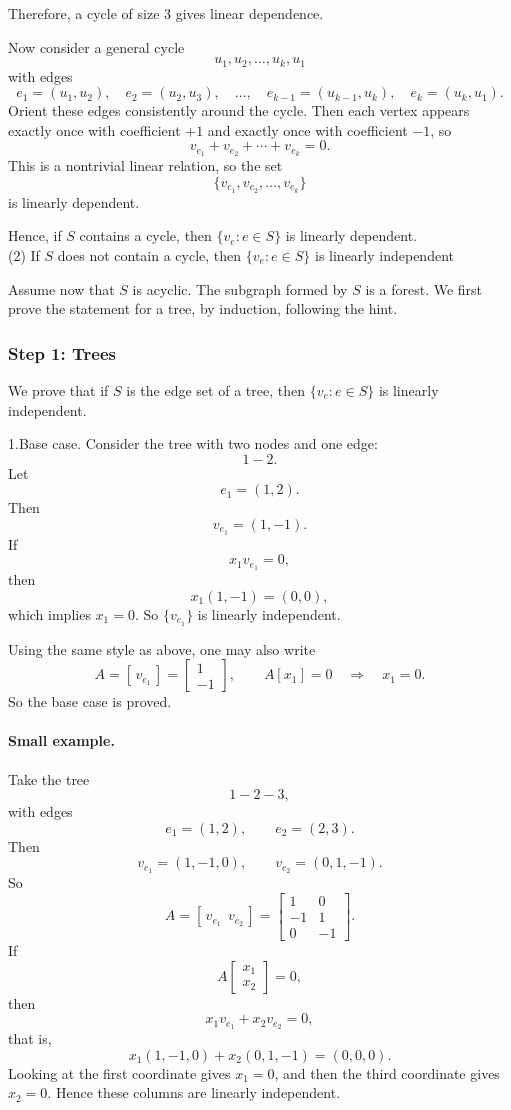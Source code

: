 \documentclass[11pt]{article}
\begin{document}
Therefore, a cycle of size $3$ gives linear dependence.

\vspace{0.5em}

Now consider a general cycle
\[
u_1,u_2,\dots,u_{k},u_1
\]
with edges
\[
e_1=(u_1,u_2),\quad
e_2=(u_2,u_3),\quad
\dots,\quad
e_{k-1}=(u_{k-1},u_k),\quad
e_k=(u_k,u_1).
\]
Orient these edges consistently around the cycle. Then each vertex appears exactly once with coefficient $+1$ and exactly once with coefficient $-1$, so
\[
v_{e_1}+v_{e_2}+\cdots+v_{e_k}=0.
\]
This is a nontrivial linear relation, so the set
\[
\{v_{e_1},v_{e_2},\dots,v_{e_k}\}
\]
is linearly dependent.

Hence, if $S$ contains a cycle, then $\{v_e:e\in S\}$ is linearly dependent.
\vspace{1em}
\\

\noindent (2) If $S$ does not contain a cycle, then $\{v_e:e\in S\}$ is linearly independent

Assume now that $S$ is acyclic. The subgraph formed by $S$ is a forest.  
We first prove the statement for a tree, by induction, following the hint.

\subsubsection*{Step 1: Trees}

We prove that if $S$ is the edge set of a tree, then $\{v_e:e\in S\}$ is linearly independent.

1.Base case.
Consider the tree with two nodes and one edge:
\[
1-2.
\]
Let
\[
e_1=(1,2).
\]
Then
\[
v_{e_1}=(1,-1).
\]
If
\[
x_1v_{e_1}=0,
\]
then
\[
x_1(1,-1)=(0,0),
\]
which implies $x_1=0$. So $\{v_{e_1}\}$ is linearly independent.

Using the same style as above, one may also write
\[
A=[\,v_{e_1}\,]
=
\begin{bmatrix}
1\\
-1
\end{bmatrix},
\qquad
A[x_1]=0
\quad\Longrightarrow\quad
x_1=0.
\]
So the base case is proved.

\paragraph{Small example.}
Take the tree
\[
1-2-3,
\]
with edges
\[
e_1=(1,2),\qquad e_2=(2,3).
\]
Then
\[
v_{e_1}=(1,-1,0),\qquad
v_{e_2}=(0,1,-1).
\]
So
\[
A=[\,v_{e_1}\ \ v_{e_2}\,]
=
\begin{bmatrix}
1&0\\
-1&1\\
0&-1
\end{bmatrix}.
\]
If
\[
A
\begin{bmatrix}
x_1\\x_2
\end{bmatrix}
=0,
\]
then
\[
x_1v_{e_1}+x_2v_{e_2}=0,
\]
that is,
\[
x_1(1,-1,0)+x_2(0,1,-1)=(0,0,0).
\]
Looking at the first coordinate gives $x_1=0$, and then the third coordinate gives $x_2=0$. Hence these columns are linearly independent.
\end{document}
